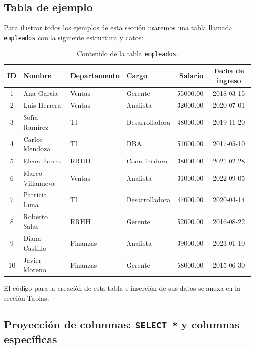 \documentclass[12pt, a4paper]{article}
\begin{document}
	\subsection{Tabla de ejemplo}
	
	Para ilustrar todos los ejemplos de esta sección usaremos una tabla
	llamada \texttt{empleados} con la siguiente estructura y datos:
\begin{center}
 \begin{table}[H]
    \centering
    \caption{Contenido de la tabla \texttt{empleados}.}
    \label{tab:empleados}
    \begin{tabular}{clllrc}
        \toprule
        \textbf{ID} & \textbf{Nombre} & \textbf{Departamento} & \textbf{Cargo} & \textbf{Salario} & \textbf{Fecha de ingreso} \\
        \midrule
        1  & Ana García        & Ventas   & Gerente         & 55000.00 & 2018-03-15 \\
        2  & Luis Herrera      & Ventas   & Analista        & 32000.00 & 2020-07-01 \\
        3  & Sofía Ramírez     & TI       & Desarrolladora  & 48000.00 & 2019-11-20 \\
        4  & Carlos Mendoza    & TI       & DBA             & 51000.00 & 2017-05-10 \\
        5  & Elena Torres      & RRHH     & Coordinadora    & 38000.00 & 2021-02-28 \\
        6  & Marco Villanueva  & Ventas   & Analista        & 31000.00 & 2022-09-05 \\
        7  & Patricia Luna     & TI       & Desarrolladora  & 47000.00 & 2020-04-14 \\
        8  & Roberto Salas     & RRHH     & Gerente         & 52000.00 & 2016-08-22 \\
        9  & Diana Castillo    & Finanzas & Analista        & 39000.00 & 2023-01-10 \\
        10 & Javier Moreno     & Finanzas & Gerente         & 58000.00 & 2015-06-30 \\
        \bottomrule
    \end{tabular}
\end{table}
\end{center}
El código para la creación de esta tabla e inserción de sus datos se anexa en la sección Tablas.
        

	
	\subsection{Proyección de columnas: \texttt{SELECT *} y columnas específicas}
	
\end{document}
